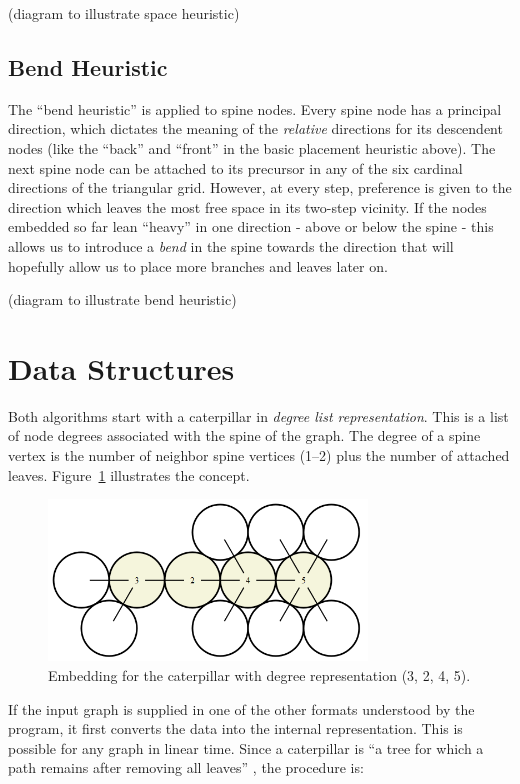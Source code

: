 \documentclass[draft,final]{vutinfth} %
\begin{document}
(diagram to illustrate space heuristic)

\subsection{Bend Heuristic}

The ``bend heuristic'' is applied to spine nodes.
Every spine node has a principal direction, which dictates the meaning of the \emph{relative} directions for its descendent nodes (like the ``back'' and ``front'' in the basic placement heuristic above).
The next spine node can be attached to its precursor in any of the six cardinal directions of the triangular grid. However, at every step, preference is given to the direction which leaves the most free space in its two-step vicinity.
If the nodes embedded so far lean ``heavy'' in one direction - above or below the spine - this allows us to introduce a \emph{bend} in the spine towards the direction that will hopefully allow us to place more branches and leaves later on.

(diagram to illustrate bend heuristic)



\section{Data Structures}

Both algorithms start with a caterpillar in \emph{degree list representation}.
This is a list of node degrees associated with the spine of the graph.
The degree of a spine vertex is the number of neighbor spine vertices (1--2) plus the number of attached leaves. Figure~\ref{fig:degree_repr} illustrates the concept.

\begin{figure}
    \centering
    \includegraphics[width=240pt]{graphics/degree_repr.png}
    \caption{Embedding for the caterpillar with degree representation (3, 2, 4, 5).}
    \label{fig:degree_repr}
\end{figure}

If the input graph is supplied in one of the other formats understood by the program, it first converts the data into the internal representation. This is possible for any graph in linear time.
Since a caterpillar is ``a tree for which a path remains after removing all leaves'' \cite{Klemz2015}, the procedure is:
\end{document}
